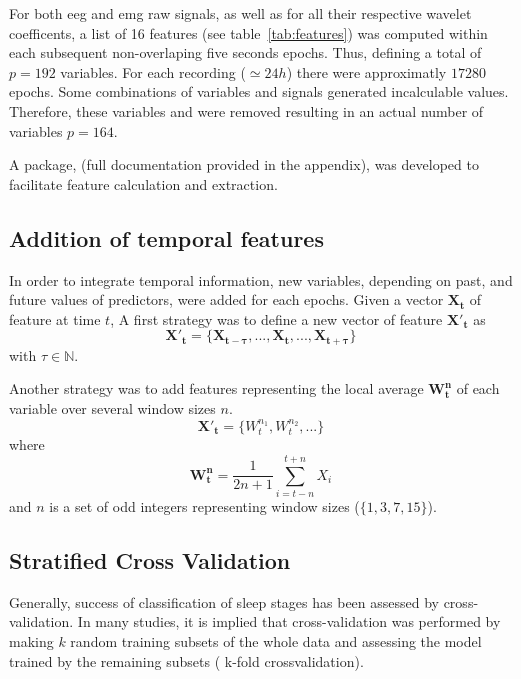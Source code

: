 For both \gls{eeg} and \gls{emg} raw signals, as well as for all their respective wavelet coefficents,
a list of 16 features (see table~\ref{tab:features}) was computed within each subsequent non-overlaping five seconds epochs.
Thus, defining a total of $p=192$ variables. For each recording ($\simeq 24h$) there were approximatly $17280$ epochs. 
Some combinations of variables and signals generated incalculable values.
Therefore, these variables and were removed resulting in an actual number of variables $p=164$.



A \py{} package, \pr{} (full documentation provided in the appendix), was developed to facilitate feature calculation and extraction.

\subsection{Addition of temporal features}
In order to integrate temporal information, new variables, depending on past, and future values of predictors, were added for each epochs.
Given a vector $\mathbf{X_t}$ of feature at time $t$,
A first strategy was to define a new vector of feature $\mathbf{{X'}_t}$ as
\begin{equation}
\mathbf{{X'}_t} = \{\mathbf{X_{t-\tau}}, ..., \mathbf{X_t}, ..., \mathbf{X_{t+\tau}}\}
\label{eq:tau}
\end{equation}
with $\tau \in \mathbb{N}$.

Another strategy was to add features representing the local average $\mathbf{W^n_t}$ of each variable over several window sizes $n$.
\begin{equation}
\mathbf{{X'}_t} = \{W^{n_1}_t, W^{n_2}_t, ...\}
\label{eq:window}
\end{equation}
where
\[
\mathbf{W^n_t} = \frac{1}{2n+1} \sum_{i = t-n}^{t+n}{X_i}
\]
and $n$ is a set of odd integers representing window sizes (\eg $\{1,3,7,15\}$).



\subsection{Stratified Cross Validation}
Generally, success of classification of sleep stages has been assessed by cross-validation.
In many studies\citationneeded{}, it is implied that cross-validation was performed by making $k$ random training subsets 
of the whole data and assessing the model trained by the remaining subsets (\ie{} k-fold crossvalidation).

